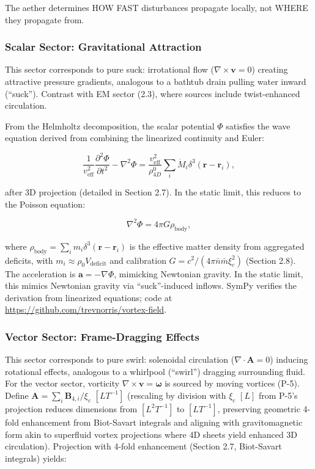 \begin{tcolorbox}
The aether determines HOW FAST disturbances propagate locally, not WHERE they propagate from.
\end{tcolorbox}

\subsubsection{Scalar Sector: Gravitational Attraction}

This sector corresponds to pure suck: irrotational flow ($\nabla \times \mathbf{v} = 0$) creating attractive pressure gradients, analogous to a bathtub drain pulling water inward (``suck''). Contrast with EM sector (2.3), where sources include twist-enhanced circulation.

From the Helmholtz decomposition, the scalar potential $\Phi$ satisfies the wave equation derived from combining the linearized continuity and Euler:

\begin{equation}
\frac{1}{v_{\text{eff}}^2} \frac{\partial^2 \Phi}{\partial t^2} - \nabla^2 \Phi = \frac{v_{\text{eff}}^2}{\rho_{4D}^0} \sum_i \dot{M}_i \delta^3(\mathbf{r} - \mathbf{r}_i),
\end{equation}

after 3D projection (detailed in Section 2.7). In the static limit, this reduces to the Poisson equation:

\begin{equation}
\nabla^2 \Phi = 4\pi G \rho_{\text{body}},
\end{equation}

where $\rho_{\text{body}} = \sum_i m_i \delta^3(\mathbf{r} - \mathbf{r}_i)$ is the effective matter density from aggregated deficits, with $m_i \approx \rho_0 V_{\text{deficit}}$ and calibration $G = c^2 / (4\pi \bar{n} \bar{m} \xi_c^2)$ (Section 2.8). The acceleration is $\mathbf{a} = -\nabla \Phi$, mimicking Newtonian gravity. In the static limit, this mimics Newtonian gravity via ``suck''-induced inflows. SymPy verifies the derivation from linearized equations; code at \url{https://github.com/trevnorris/vortex-field}.

\subsubsection{Vector Sector: Frame-Dragging Effects}

This sector corresponds to pure swirl: solenoidal circulation ($\nabla \cdot \mathbf{A} = 0$) inducing rotational effects, analogous to a whirlpool (``swirl'') dragging surrounding fluid. For the vector sector, vorticity $\nabla \times \mathbf{v} = \boldsymbol{\omega}$ is sourced by moving vortices (P-5). Define $\mathbf{A} = \sum_i \mathbf{B}_{4,i} / \xi_c$ $[L T^{-1}]$ (rescaling by division with $\xi_c$ $[L]$ from P-5's projection reduces dimensions from $[L^2 T^{-1}]$ to $[L T^{-1}]$, preserving geometric 4-fold enhancement from Biot-Savart integrals and aligning with gravitomagnetic form akin to superfluid vortex projections where 4D sheets yield enhanced 3D circulation). Projection with 4-fold enhancement (Section 2.7, Biot-Savart integrals) yields:

